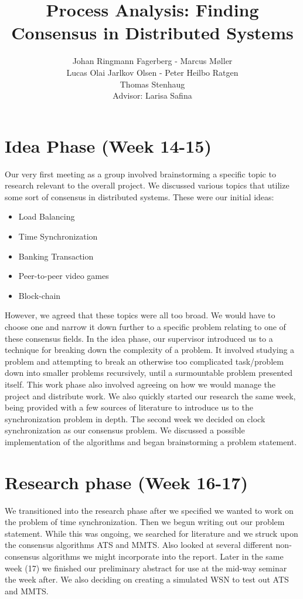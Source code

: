 \documentclass[12pt]{article}
\title{Process Analysis: Finding Consensus in Distributed Systems}
\author{Johan Ringmann Fagerberg -
  Marcus Møller\\
  Lucas Olai Jarlkov Olsen - 
  Peter Heilbo Ratgen \\
  Thomas Stenhaug 
  \\
  Advisor: Larisa Safina}
\begin{document}
\maketitle
\section{Idea Phase (Week 14-15)}
Our very first meeting as a group involved brainstorming a specific topic to research relevant to the overall project. We discussed various topics that utilize some sort of consensus in distributed systems. These were our initial ideas:

\begin{itemize}
    \item Load Balancing
    \item Time Synchronization
    \item Banking Transaction
    \item Peer-to-peer video games
    \item Block-chain
\end{itemize}

However, we agreed that these topics were all too broad. We would have to choose one and narrow it down further to a specific problem relating to one of these consensus fields. In the idea phase, our supervisor introduced us to a technique for breaking down the complexity of a problem. It involved studying a problem and attempting to break an otherwise too complicated task/problem down into smaller problems recursively, until a surmountable problem presented itself. This work phase also involved agreeing on how we would manage the project and distribute work. We also quickly started our research the same week, being provided with a few sources of literature to introduce us to the synchronization problem in depth. The second week we decided on clock synchronization as our consensus problem. We discussed a possible implementation of the algorithms and began brainstorming a problem statement.

\section{Research phase (Week 16-17)}
We transitioned into the research phase after we specified we wanted to work on the problem of time synchronization. Then we begun writing out our problem statement. While this was ongoing, we searched  for literature and we struck upon the consensus algorithms ATS and MMTS. Also looked at several different non-consensus algorithms we might incorporate into the report. 
Later in the same week (17) we finished our preliminary abstract for use at the mid-way seminar the week after. We also deciding on creating a simulated WSN to test out ATS and MMTS.
\end{document}
